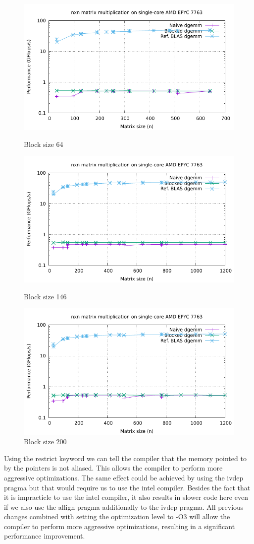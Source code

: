\documentclass[unicode,11pt,a4paper,oneside,numbers=endperiod,openany]{scrartcl}
\begin{document}
\begin{figure}[H]
    \centering
    \includegraphics[width=0.7\linewidth]{timing_64.pdf}
    \caption{Block size 64}
    \label{fig:image1}
    
    \vspace{10pt}
    
    \includegraphics[width=0.7\linewidth]{timing_146.pdf}
    \caption{Block size 146}
    \label{fig:image2}
    
    \vspace{10pt}
    
    \includegraphics[width=0.7\linewidth]{timing_200.pdf}
    \caption{Block size 200}
    \label{fig:image3}
\end{figure}

Using the restrict keyword we can tell the compiler that the memory pointed to by the pointers is not aliased.
This allows the compiler to perform more aggressive optimizations.
The same effect could be achieved by using the ivdep pragma but that would require us to use the intel compiler.
Besides the fact that it is impracticle to use the intel compiler, it also results in slower code here even if we also use the allign pragma additionally to the ivdep pragma.
All previous changes combined with setting the optimization level to -O3 will allow the compiler to perform more aggressive optimizations, resulting in a significant performance improvement.
\end{document}
